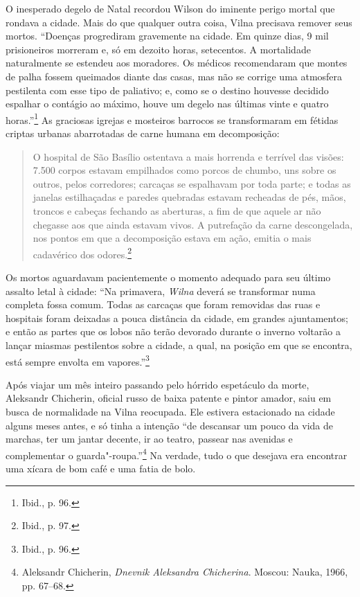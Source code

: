 O inesperado degelo de Natal recordou Wilson do iminente perigo mortal
que rondava a cidade. Mais do que qualquer outra coisa, Vilna precisava
remover seus mortos. ``Doenças progrediram gravemente na cidade. Em
quinze dias, 9 mil prisioneiros morreram e, só em dezoito horas,
setecentos. A mortalidade naturalmente se estendeu aos moradores. Os
médicos recomendaram que montes de palha fossem queimados diante das
casas, mas não se corrige uma atmosfera pestilenta com esse tipo de
paliativo; e, como se o destino houvesse decidido espalhar o contágio ao
máximo, houve um degelo nas últimas vinte e quatro horas.''\footnote{Ibid., p. 96.} As graciosas igrejas e mosteiros barrocos se transformaram em
fétidas criptas urbanas abarrotadas de carne humana em decomposição:

\begin{quote}
O hospital de São Basílio ostentava a mais horrenda e terrível das
visões: 7.500 corpos estavam empilhados como porcos de
chumbo, uns sobre os outros, pelos corredores; carcaças se espalhavam
por toda parte; e todas as janelas estilhaçadas e paredes quebradas
estavam recheadas de pés, mãos, troncos e cabeças fechando as aberturas,
a fim de que aquele ar não chegasse aos que ainda estavam vivos. A
putrefação da carne descongelada, nos pontos em que a decomposição
estava em ação, emitia o mais cadavérico dos odores.\footnote{Ibid., p. 97.}
\end{quote}  

Os mortos aguardavam pacientemente o momento adequado para seu último
assalto letal à cidade: ``Na primavera, \textit{Wilna} deverá se transformar numa
completa fossa comum. Todas as carcaças que foram removidas das ruas e
hospitais foram deixadas a pouca distância da cidade, em grandes
ajuntamentos; e então as partes que os lobos não terão devorado durante
o inverno voltarão a lançar miasmas pestilentos sobre a cidade, a qual,
na posição em que se encontra, está sempre envolta em
vapores.''\footnote{Ibid., p. 96.}

Após viajar um mês inteiro passando pelo hórrido espetáculo da morte,
Aleksandr Chicherin, oficial russo de baixa patente e pintor amador,
saiu em busca de normalidade na Vilna reocupada. Ele estivera
estacionado na cidade alguns meses antes, e só tinha a intenção ``de
descansar um pouco da vida de marchas, ter um jantar decente, ir ao
teatro, passear nas avenidas e complementar o guarda"-roupa.''\footnote{Aleksandr Chicherin, \textit{Dnevnik Aleksandra Chicherina}. Moscou: Nauka, 1966, pp. 67--68.} Na verdade, tudo o que desejava era encontrar uma xícara de bom café e uma
fatia de bolo.

